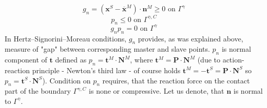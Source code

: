 \documentclass{article}
\newcommand{\beq}{\begin{equation}}
\newcommand{\eeq}{\end{equation}}
\begin{document}
\beq\label{11}
g_{n}=\left(\mathbf{x}^{S}-\overline{\mathbf{x}}^{M}\right) \cdot \mathbf{n}^{M} \geq 0 \text{ on } \Gamma^{\gamma}
\eeq
\beq\label{12}
p_{n} \leq 0 \text{ on } \Gamma^{\gamma,C}
\eeq
\beq\label{13}
g_{n} p_{n}=0 \text{ on } \Gamma^{\gamma}
\eeq     
In Hertz–Signorini–Moreau conditions, $ g_{n} $ provides, as was explained above, measure of "gap" between corresponding master and slave points. $ p_{n} $ is normal component of $ \mathbf{t} $ defined as $ p_{n} = \mathbf{t}^{M}\cdot\mathbf{N}^{M} $, where $ \mathbf{t}^{M} = \mathbf{P}\cdot\mathbf{N}^{M} $ (due to action-reaction principle - Newton's third law - of course holds $ \mathbf{t}^{M} = -\mathbf{t}^{S}=\mathbf{P}\cdot\mathbf{N}^{S} $ so $ p_{n} = \mathbf{t}^{S}\cdot\mathbf{N}^{S} $). Condition on $ p_{n} $ requires, that the reaction force on the contact part of the boundary $ \Gamma^{\gamma,C}$ is none or compressive. Let us denote, that $ \mathbf{n} $ is normal to $\Gamma^{\gamma}$.
\end{document}
